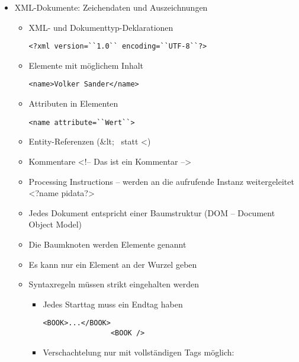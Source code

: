 \begin{itemize}
    \item XML-Dokumente: Zeichendaten und Auszeichnungen
    \begin{itemize}
        \item XML- und Dokumenttyp-Deklarationen
        \lstset{language=XML}
        \begin{lstlisting}[label={lst:lstlisting}]
            <?xml version=``1.0`` encoding=``UTF-8``?>
        \end{lstlisting}
        \item Elemente mit möglichem Inhalt \lstset{language=XML}
        \begin{lstlisting}[label={lst:lstlisting2}]
            <name>Volker Sander</name>
        \end{lstlisting}
        \item Attributen in Elementen
        \lstset{language=XML}
        \begin{lstlisting}[label={lst:lstlisting3}]
            <name attribute=``Wert``>
        \end{lstlisting}
        \item Entity-Referenzen (\&lt; \ statt <)
        \item Kommentare \linebreak
        <!– Das ist ein Kommentar -->
        \item Processing Instructions – werden an die aufrufende Instanz weitergeleitet \linebreak
        <?name pidata?>
        \item Jedes Dokument entspricht einer Baumstruktur (DOM – Document Object Model)
        \item Die Baumknoten werden Elemente genannt
        \item Es kann nur ein Element an der Wurzel geben
        \item Syntaxregeln müssen strikt eingehalten werden
        \begin{itemize}
            \item Jedes Starttag muss ein Endtag haben
            \lstset{language=XML}
            \begin{lstlisting}[label={lst:lstlisting4}]
                <BOOK>...</BOOK>
                <BOOK />
            \end{lstlisting}
            \item Verschachtelung nur mit vollständigen Tags möglich:

\end{itemize}
\end{itemize}
\end{itemize}
